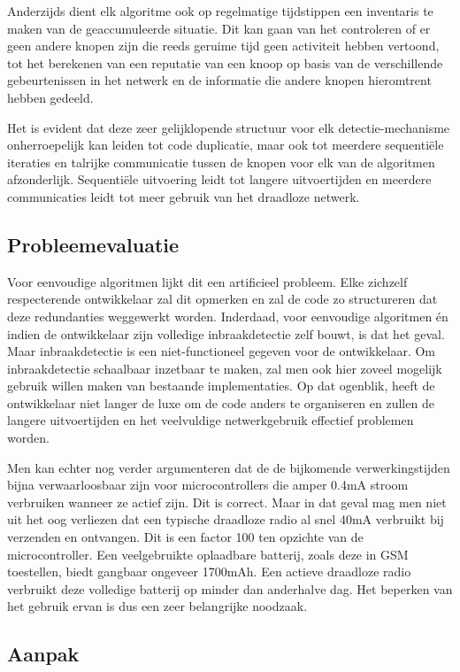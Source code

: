 \documentclass[12pt,a4paper,draft]{article}
\begin{document}
Anderzijds dient elk algoritme ook op regelmatige tijdstippen een inventaris te
maken van de geaccumuleerde situatie. Dit kan gaan van het controleren of er
geen andere knopen zijn die reeds geruime tijd geen activiteit hebben vertoond,
tot het berekenen van een reputatie van een knoop op basis van de verschillende
gebeurtenissen in het netwerk en de informatie die andere knopen hieromtrent
hebben gedeeld.

Het is evident dat deze zeer gelijklopende structuur voor elk
detectie-mechanisme onherroepelijk kan leiden tot code duplicatie, maar ook tot
meerdere sequenti\"ele iteraties en talrijke communicatie tussen de knopen voor
elk van de algoritmen afzonderlijk. Sequenti\"ele uitvoering leidt tot langere
uitvoertijden en meerdere communicaties leidt tot meer gebruik van het
draadloze netwerk.

\subsection*{Probleemevaluatie}

Voor eenvoudige algoritmen lijkt dit een artificieel probleem. Elke zichzelf
respecterende ontwikkelaar zal dit opmerken en zal de code zo structureren dat
deze redundanties weggewerkt worden. Inderdaad, voor eenvoudige algoritmen \'en
indien de ontwikkelaar zijn volledige inbraakdetectie zelf bouwt, is dat het
geval. Maar inbraakdetectie is een niet-functioneel gegeven voor de
ontwikkelaar. Om inbraakdetectie schaalbaar inzetbaar te maken, zal men ook
hier zoveel mogelijk gebruik willen maken van bestaande implementaties. Op dat
ogenblik, heeft de ontwikkelaar niet langer de luxe om de code anders te
organiseren en zullen de langere uitvoertijden en het veelvuldige
netwerkgebruik effectief problemen worden.

Men kan echter nog verder argumenteren dat de de bijkomende verwerkingstijden
bijna verwaarloosbaar zijn voor microcontrollers die amper 0.4mA stroom
verbruiken wanneer ze actief zijn. Dit is correct. Maar in dat geval mag men
niet uit het oog verliezen dat een typische draadloze radio al snel 40mA
verbruikt bij verzenden en ontvangen. Dit is een factor 100 ten opzichte van de
microcontroller. Een veelgebruikte oplaadbare batterij, zoals deze in GSM
toestellen, biedt gangbaar ongeveer 1700mAh. Een actieve draadloze radio
verbruikt deze volledige batterij op minder dan anderhalve dag. Het beperken
van het gebruik ervan is dus een zeer belangrijke noodzaak.

\subsection*{Aanpak}
\end{document}
